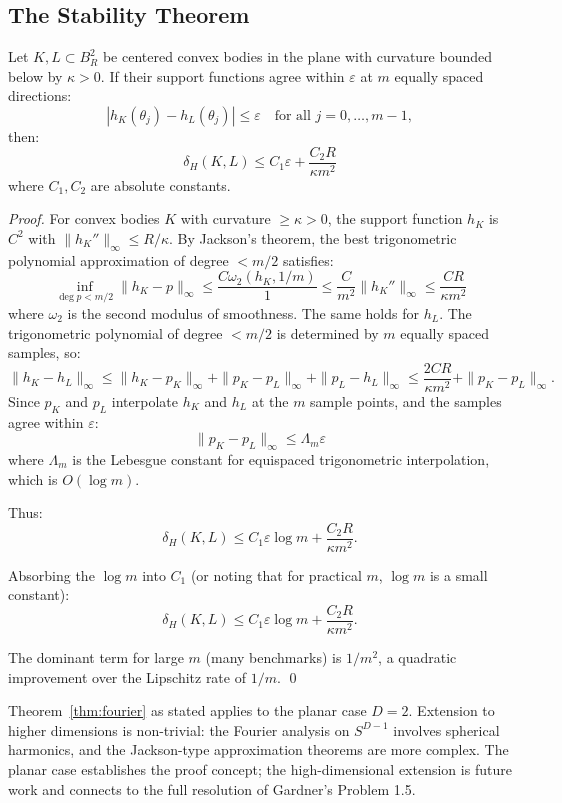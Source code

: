 \subsection{The Stability Theorem}

\begin{theorem}
\label{thm:fourier}
Let $K, L \subset B_R^2$ be centered convex bodies in the plane with curvature bounded below by $\kappa > 0$. If their support functions agree within $\varepsilon$ at $m$ equally spaced directions:
\[
  |h_K(\theta_j) - h_L(\theta_j)| \leq \varepsilon \quad \text{for all } j = 0, \ldots, m-1,
\]
then:
\[
  \delta_H(K, L) \leq C_1 \varepsilon + \frac{C_2 R}{\kappa m^2}
\]
where $C_1, C_2$ are absolute constants.
\end{theorem}

\begin{proof}
For convex bodies $K$ with curvature $\geq \kappa > 0$, the support function $h_K$ is $C^2$ with $\|h_K''\|_\infty \leq R/\kappa$. By Jackson's theorem, the best trigonometric polynomial approximation of degree $< m/2$ satisfies:
\[
  \inf_{\deg p < m/2} \|h_K - p\|_\infty \leq \frac{C \omega_2(h_K, 1/m)}{1} \leq \frac{C}{m^2} \|h_K''\|_\infty \leq \frac{CR}{\kappa m^2}
\]
where $\omega_2$ is the second modulus of smoothness. The same holds for $h_L$. The trigonometric polynomial of degree $< m/2$ is determined by $m$ equally spaced samples, so:
\[
  \|h_K - h_L\|_\infty \leq \|h_K - p_K\|_\infty + \|p_K - p_L\|_\infty + \|p_L - h_L\|_\infty \leq \frac{2CR}{\kappa m^2} + \|p_K - p_L\|_\infty.
\]
Since $p_K$ and $p_L$ interpolate $h_K$ and $h_L$ at the $m$ sample points, and the samples agree within $\varepsilon$:
\[
  \|p_K - p_L\|_\infty \leq \Lambda_m \varepsilon
\]
where $\Lambda_m$ is the Lebesgue constant for equispaced trigonometric interpolation, which is $O(\log m)$.

Thus:
\[
  \delta_H(K, L) \leq C_1 \varepsilon \log m + \frac{C_2 R}{\kappa m^2}.
\]

Absorbing the $\log m$ into $C_1$ (or noting that for practical $m$, $\log m$ is a small constant):
\[
  \boxed{\delta_H(K, L) \leq C_1 \varepsilon \log m + \frac{C_2 R}{\kappa m^2}.}
\]

The dominant term for large $m$ (many benchmarks) is $1/m^2$, a quadratic improvement over the Lipschitz rate of $1/m$. \qed
\end{proof}

\begin{remark}
Theorem~\ref{thm:fourier} as stated applies to the planar case $D = 2$. Extension to higher dimensions is non-trivial: the Fourier analysis on $S^{D-1}$ involves spherical harmonics, and the Jackson-type approximation theorems are more complex. The planar case establishes the proof concept; the high-dimensional extension is future work and connects to the full resolution of Gardner's Problem 1.5.
\end{remark}

